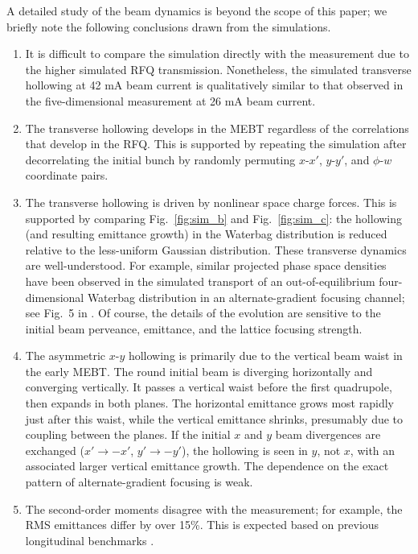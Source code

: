 \documentclass[%
 reprint,
 amsmath,amssymb,
 aps,
prstab,
]{revtex4-2}
\begin{document}
A detailed study of the beam dynamics is beyond the scope of this paper; we briefly note the following conclusions drawn from the simulations.
%
\begin{enumerate}
    
    \item It is difficult to compare the simulation directly with the measurement due to the higher simulated RFQ transmission. Nonetheless, the simulated transverse hollowing at 42 mA beam current is qualitatively similar to that observed in the five-dimensional measurement at 26 mA beam current. 
    
    \item The transverse hollowing develops in the MEBT regardless of the correlations that develop in the RFQ. This is supported by repeating the simulation after decorrelating the initial bunch by randomly permuting $x$-$x'$, $y$-$y'$, and $\phi$-$w$ coordinate pairs.
    
    \item The transverse hollowing is driven by nonlinear space charge forces. This is supported by comparing Fig.~\ref{fig:sim_b} and Fig.~\ref{fig:sim_c}: the hollowing (and resulting emittance growth) in the Waterbag distribution is reduced relative to the less-uniform Gaussian distribution. These transverse dynamics are well-understood. For example, similar projected phase space densities have been observed in the simulated transport of an out-of-equilibrium four-dimensional Waterbag distribution in an alternate-gradient focusing channel; see Fig.~5 in \cite{Lund2009}. Of course, the details of the evolution are sensitive to the initial beam perveance, emittance, and the lattice focusing strength.
    
    \item The asymmetric $x$-$y$ hollowing is primarily due to the vertical beam waist in the early MEBT. The round initial beam is diverging horizontally and converging vertically. It passes a vertical waist before the first quadrupole, then expands in both planes. The horizontal emittance grows most rapidly just after this waist, while the vertical emittance shrinks, presumably due to coupling between the planes. If the initial $x$ and $y$ beam divergences are exchanged ($x' \rightarrow -x'$, $y' \rightarrow -y'$), the hollowing is seen in $y$, not $x$, with an associated larger vertical emittance growth. The dependence on the exact pattern of alternate-gradient focusing is weak.
    
    \item The second-order moments disagree with the measurement; for example, the RMS emittances differ by over 15\%. This is expected based on previous longitudinal benchmarks \cite{Ruisard2020}.

\end{enumerate}
\end{document}
